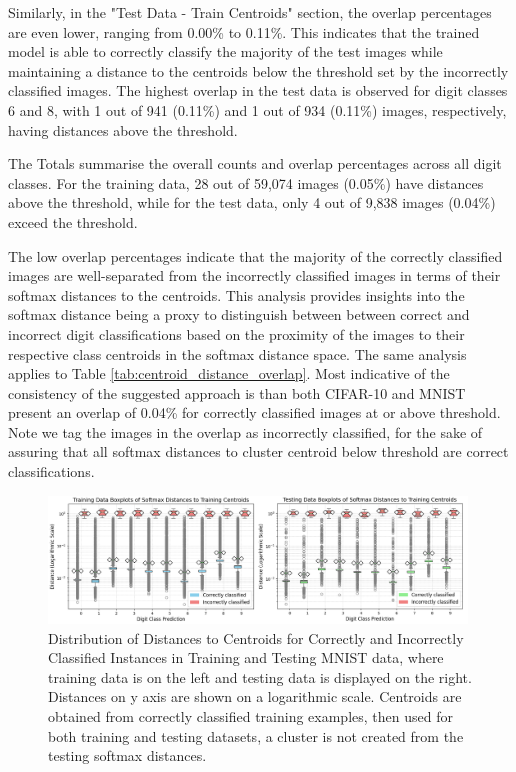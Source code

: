 Similarly, in the "Test Data - Train Centroids" section, the overlap percentages are even lower, ranging from 0.00\% to 0.11\%. This indicates that the trained model is able to correctly classify the majority of the test images while maintaining a distance to the centroids below the threshold set by the incorrectly classified images. The highest overlap in the test data is observed for digit classes 6 and 8, with 1 out of 941 (0.11\%) and 1 out of 934 (0.11\%) images, respectively, having distances above the threshold.

The Totals summarise the overall counts and overlap percentages across all digit classes. For the training data, 28 out of 59,074 images (0.05\%) have distances above the threshold, while for the test data, only 4 out of 9,838 images (0.04\%) exceed the threshold.

The low overlap percentages indicate that the majority of the correctly classified images are well-separated from the incorrectly classified images in terms of their softmax distances to the centroids. This analysis provides insights into the softmax distance being a proxy to distinguish between between correct and incorrect digit classifications based on the proximity of the images to their respective class centroids in the softmax distance space. The same analysis applies to Table \ref{tab:centroid_distance_overlap}. Most indicative of the consistency of the suggested approach is than both CIFAR-10 and MNIST present an overlap of 0.04\% for correctly classified images at or above threshold. Note we tag the images in the overlap as incorrectly classified, for the sake of assuring that all softmax distances to cluster centroid below threshold are correct classifications.

\begin{figure}[ht]
    \centering
    \includegraphics[width=0.99\textwidth]{Figures/MNIST_boxplots_side_by_side_x2.png}   \captionsetup{justification=raggedright,singlelinecheck=false}
    \caption{Distribution of Distances to Centroids for Correctly and Incorrectly Classified Instances in Training and Testing MNIST data, where training data is on the left and testing data is displayed on the right. Distances on y axis are shown on a logarithmic scale. Centroids are obtained from correctly classified training examples, then used for both training and testing datasets, a cluster is not created from the testing softmax distances. }
    \label{fig:MNIST_boxplots_side_by_side_x2}
\end{figure}

